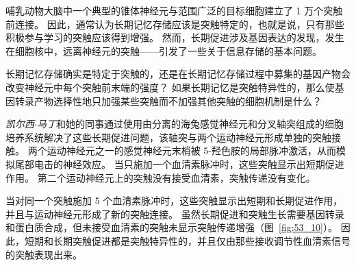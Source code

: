 哺乳动物大脑中一个典型的锥体神经元与范围广泛的目标细胞建立了 1 万个突触前连接。
因此，通常认为长期记忆存储应该是突触特定的，也就是说，只有那些积极参与学习的突触应该得到增强。
然而，长期促进涉及基因表达的发现，发生在细胞核中，远离神经元的突触——引发了一些关于信息存储的基本问题。


长期记忆存储确实是特定于突触的，还是在长期记忆存储过程中募集的基因产物会改变神经元中每个突触前末端的强度？
如果长期记忆是突触特异性的，那么使基因转录产物选择性地只加强某些突触而不加强其他突触的细胞机制是什么？


\textit{凯尔西$\cdot$马丁}和她的同事通过使用由分离的海兔感觉神经元和分叉轴突组成的细胞培养系统解决了这些长期促进问题，该轴突与两个运动神经元形成单独的突触接触。
两个运动神经元之一的感觉神经元末梢被 5-羟色胺的局部脉冲激活，从而模拟尾部电击的神经效应。
当只施加一个血清素脉冲时，这些突触显示出短期促进作用。
第二个运动神经元上的突触没有接受血清素，突触传递没有变化。


当对同一个突触施加 5 个血清素脉冲时，这些突触显示出短期和长期促进作用，并且与运动神经元形成了新的突触连接。
虽然长期促进和突触生长需要基因转录和蛋白质合成，但未接受血清素的突触未显示突触传递增强（图~\ref{fig:53_10}）。
因此，短期和长期突触促进都是突触特异性的，并且仅由那些接收调节性血清素信号的突触表现出来。


